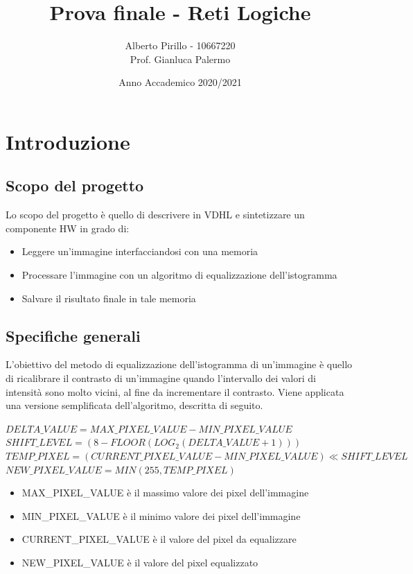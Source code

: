 \documentclass[a4paper, 12pt]{article}
\title{\Huge{Prova finale - Reti Logiche}}
\author{\Large{Alberto Pirillo - 10667220} \\ \Large{Prof. Gianluca Palermo}}
\date{Anno Accademico 2020/2021}
\begin{document}
\maketitle
\tableofcontents
\pagebreak

\section{Introduzione}
\subsection{Scopo del progetto}
Lo scopo del progetto è quello di descrivere in VDHL e sintetizzare un componente HW in grado di:
\begin{itemize}
    \item Leggere un'immagine interfacciandosi con una memoria
    \item Processare l'immagine con un algoritmo di equalizzazione dell'istogramma
    \item Salvare il risultato finale in tale memoria
\end{itemize}

\subsection{Specifiche generali}
L'obiettivo del metodo di equalizzazione dell'istogramma di un'immagine è quello di ricalibrare il contrasto di un'immagine quando l'intervallo dei valori di intensità sono molto vicini, al fine da incrementare il contrasto. Viene applicata una versione semplificata dell'algoritmo, descritta di seguito.

\bigskip\footnotesize
$DELTA\_VALUE = MAX\_PIXEL\_VALUE - MIN\_PIXEL\_VALUE$ \\
$SHIFT\_LEVEL = (8-FLOOR(LOG_2(DELTA\_VALUE + 1)))$ \\
$TEMP\_PIXEL = (CURRENT\_PIXEL\_VALUE - MIN\_PIXEL\_VALUE) \ll SHIFT\_LEVEL$ \\
$NEW\_PIXEL\_VALUE = MIN(255, TEMP\_PIXEL)$
\bigskip\normalsize

\begin{itemize}
    \item MAX\_PIXEL\_VALUE è il massimo valore dei pixel dell'immagine
    \item MIN\_PIXEL\_VALUE è il minimo valore dei pixel dell'immagine
    \item CURRENT\_PIXEL\_VALUE è il valore del pixel da equalizzare 
    \item NEW\_PIXEL\_VALUE è il valore del pixel equalizzato
\end{itemize}
\end{document}
